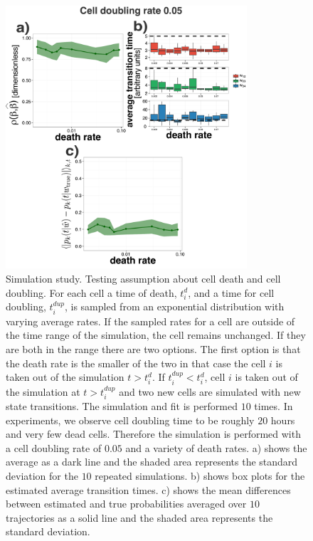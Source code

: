 \begin{figure}
  \centering
  \includegraphics[width=0.8\textwidth]{pics/realist-dupl.pdf}
  \caption{Simulation study. Testing assumption about cell death and cell doubling. For each cell a time of death, $t_i^{d}$, and a time for cell doubling, $t_i^{dup}$, is sampled from an exponential distribution with varying average rates. If the sampled rates for a cell are outside of the time range of the simulation, the cell remains unchanged. If they are both in the range there are two options. The first option is that the death rate is the smaller of the two in that case the cell $i$ is taken out of the simulation $t>t_i^d$. If $t_i^{dup}<t_i^d$, cell $i$ is taken out of the simulation at $t > t_i^{dup}$ and two new cells are simulated with new state transitions. The simulation and fit is performed $10$ times. In experiments, we observe cell doubling time to be roughly $20$ hours and very few dead cells. Therefore the simulation is performed with a cell doubling rate of $0.05$ and a variety of death rates. a) shows the average as a dark line and the shaded area represents the standard deviation for the $10$ repeated simulations. b) shows box plots for the estimated average transition times. c) shows the mean differences between estimated and true probabilities averaged over $10$ trajectories as a solid line and the shaded area represents the standard deviation.}
  \label{fig:dupl-realistic}
\end{figure}

